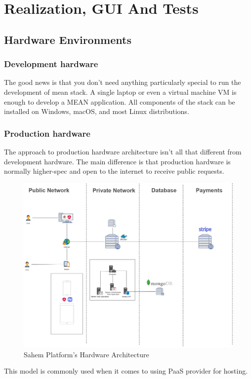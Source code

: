 

\setcounter{mtc}{11}

\chapter{Realization, GUI And Tests}%
\label{chap:chapter_four}
\minitoc

\section{Hardware Environments}

\subsection{Development hardware }
The good news is that you don’t need anything particularly special to run the development of mean stack. A single laptop or even a virtual machine \ac{VM} is enough to develop a MEAN application. All components of the stack can be installed on Windows, macOS, and most Linux distributions.

\subsection{Production hardware }
The approach to production hardware architecture isn’t all that different from development hardware. The main difference is that production hardware is normally higher-spec and open to the internet to receive public requests.

\begin{figure}[!ht]
      \centering
      \includegraphics[scale=0.25]{assets/architecturedrawio.jpg}
      \caption{Sahem Platform's Hardware Architecture}
      \label{fig:sahemarchitecturedrawio}
\end{figure}
This model is commonly used when it comes to using \ac{PaaS} provider for hosting.
